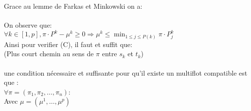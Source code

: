 \documentclass[t,10pt]{beamer}
\begin{document}
    \begin{frame}
        Grace au lemme de Farkas et Minkowski on a: \\
        \vspace{0.2cm}
        \\
        \vspace{0.2cm}
        On observe que: \\
        \vspace{0.2cm}
        $\forall k \in [1, p], \pi \cdot P^{k} - \mu^{k} \ge 0
        \Rightarrow \mu^{k} \le \displaystyle \min_{1 \le j \le P(k)} \pi \cdot P_{j}^{k}$
        \\
        \vspace{0.2cm}
        Ainsi pour verifier (C), il faut et suffit que:
         \\
        \vspace{0.1cm}
        (Plus court chemin au sens de $\pi$ entre $s_{k}$ et $t_{k}$)
        \vspace{0.1cm}
        \\
        \underline{} \\
        une condition nécessaire et suffisante pour qu’il existe un multiflot compatible est que : \\
        $\forall \pi = (\pi_{1}, \pi_{2},\dots, \pi_{n})$: \\
        \centering
         \hspace{0.4cm} Avec $\mu = (\mu^{1},\dots, \mu^{p})$
    \end{frame}
\end{document}
